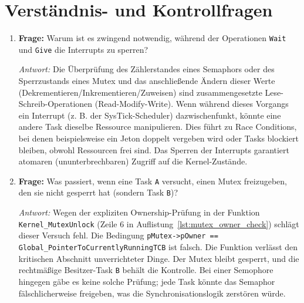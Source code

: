 \section{Verständnis- und Kontrollfragen}
\begin{enumerate}
    \item \textbf{Frage:} Warum ist es zwingend notwendig, während der Operationen \lstinline|Wait| und \lstinline|Give| die Interrupts zu sperren?
    
    \textit{Antwort:} Die Überprüfung des Zählerstandes eines Semaphors oder des Sperrzustands eines Mutex und das anschließende Ändern dieser Werte (Dekrementieren/Inkrementieren/Zuweisen) sind zusammengesetzte Lese-Schreib-Operationen (Read-Modify-Write). Wenn während dieses Vorgangs ein Interrupt (z. B. der SysTick-Scheduler) dazwischenfunkt, könnte eine andere Task dieselbe Ressource manipulieren. Dies führt zu Race Conditions, bei denen beispielsweise ein Jeton doppelt vergeben wird oder Tasks blockiert bleiben, obwohl Ressourcen frei sind. Das Sperren der Interrupts garantiert atomaren (ununterbrechbaren) Zugriff auf die Kernel-Zustände.
    
    \item \textbf{Frage:} Was passiert, wenn eine Task \lstinline|A| versucht, einen Mutex freizugeben, den sie nicht gesperrt hat (sondern Task \lstinline|B|)?
    
    \textit{Antwort:} Wegen der expliziten Ownership-Prüfung in der Funktion \lstinline|Kernel_MutexUnlock| (Zeile 6 in Auflistung~\ref{lst:mutex_owner_check}) schlägt dieser Versuch fehl. Die Bedingung \lstinline|pMutex->pOwner == Global_PointerToCurrentlyRunningTCB| ist falsch. Die Funktion verlässt den kritischen Abschnitt unverrichteter Dinge. Der Mutex bleibt gesperrt, und die rechtmäßige Besitzer-Task \lstinline|B| behält die Kontrolle. Bei einer Semophore hingegen gäbe es keine solche Prüfung; jede Task könnte das Semaphor fälschlicherweise freigeben, was die Synchronisationslogik zerstören würde.
\end{enumerate}
